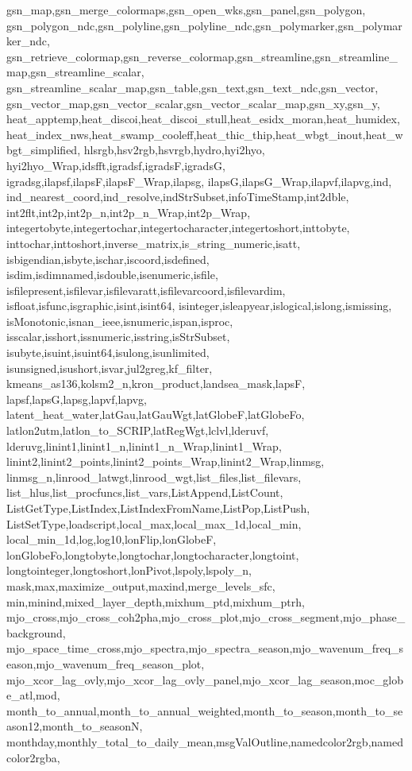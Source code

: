 {{	gsn_map,gsn_merge_colormaps,gsn_open_wks,gsn_panel,gsn_polygon,
	gsn_polygon_ndc,gsn_polyline,gsn_polyline_ndc,gsn_polymarker,gsn_polymarker_ndc,
	gsn_retrieve_colormap,gsn_reverse_colormap,gsn_streamline,gsn_streamline_map,gsn_streamline_scalar,
	gsn_streamline_scalar_map,gsn_table,gsn_text,gsn_text_ndc,gsn_vector,
	gsn_vector_map,gsn_vector_scalar,gsn_vector_scalar_map,gsn_xy,gsn_y,
	heat_apptemp,heat_discoi,heat_discoi_stull,heat_esidx_moran,heat_humidex,
	heat_index_nws,heat_swamp_cooleff,heat_thic_thip,heat_wbgt_inout,heat_wbgt_simplified,
	hlsrgb,hsv2rgb,hsvrgb,hydro,hyi2hyo,
	hyi2hyo_Wrap,idsfft,igradsf,igradsF,igradsG,
	igradsg,ilapsf,ilapsF,ilapsF_Wrap,ilapsg,
	ilapsG,ilapsG_Wrap,ilapvf,ilapvg,ind,
	ind_nearest_coord,ind_resolve,indStrSubset,infoTimeStamp,int2dble,
	int2flt,int2p,int2p_n,int2p_n_Wrap,int2p_Wrap,
	integertobyte,integertochar,integertocharacter,integertoshort,inttobyte,
	inttochar,inttoshort,inverse_matrix,is_string_numeric,isatt,
	isbigendian,isbyte,ischar,iscoord,isdefined,
	isdim,isdimnamed,isdouble,isenumeric,isfile,
	isfilepresent,isfilevar,isfilevaratt,isfilevarcoord,isfilevardim,
	isfloat,isfunc,isgraphic,isint,isint64,
	isinteger,isleapyear,islogical,islong,ismissing,
	isMonotonic,isnan_ieee,isnumeric,ispan,isproc,
	isscalar,isshort,issnumeric,isstring,isStrSubset,
	isubyte,isuint,isuint64,isulong,isunlimited,
	isunsigned,isushort,isvar,jul2greg,kf_filter,
	kmeans_as136,kolsm2_n,kron_product,landsea_mask,lapsF,
	lapsf,lapsG,lapsg,lapvf,lapvg,
	latent_heat_water,latGau,latGauWgt,latGlobeF,latGlobeFo,
	latlon2utm,latlon_to_SCRIP,latRegWgt,lclvl,lderuvf,
	lderuvg,linint1,linint1_n,linint1_n_Wrap,linint1_Wrap,
	linint2,linint2_points,linint2_points_Wrap,linint2_Wrap,linmsg,
	linmsg_n,linrood_latwgt,linrood_wgt,list_files,list_filevars,
	list_hlus,list_procfuncs,list_vars,ListAppend,ListCount,
	ListGetType,ListIndex,ListIndexFromName,ListPop,ListPush,
	ListSetType,loadscript,local_max,local_max_1d,local_min,
	local_min_1d,log,log10,lonFlip,lonGlobeF,
	lonGlobeFo,longtobyte,longtochar,longtocharacter,longtoint,
	longtointeger,longtoshort,lonPivot,lspoly,lspoly_n,
	mask,max,maximize_output,maxind,merge_levels_sfc,
	min,minind,mixed_layer_depth,mixhum_ptd,mixhum_ptrh,
	mjo_cross,mjo_cross_coh2pha,mjo_cross_plot,mjo_cross_segment,mjo_phase_background,
	mjo_space_time_cross,mjo_spectra,mjo_spectra_season,mjo_wavenum_freq_season,mjo_wavenum_freq_season_plot,
	mjo_xcor_lag_ovly,mjo_xcor_lag_ovly_panel,mjo_xcor_lag_season,moc_globe_atl,mod,
	month_to_annual,month_to_annual_weighted,month_to_season,month_to_season12,month_to_seasonN,
	monthday,monthly_total_to_daily_mean,msgValOutline,namedcolor2rgb,namedcolor2rgba,
}}
